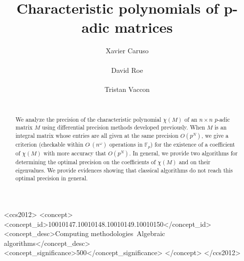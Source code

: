 \documentclass{sig-alternate-05-2015}
\newcommand{\Fp}{\mathbb{F}_p}
\newcommand{\softO}{O\tilde{~}}
\begin{document}
\newtheorem{theo}{Theorem}[section]
\newtheorem{lem}[theo]{Lemma}
\newtheorem{prop}[theo]{Proposition}
\newtheorem{cor}[theo]{Corollary}
\newtheorem{quest}[theo]{Question}
\newtheorem{conj}[theo]{Conjecture}
\theoremstyle{definition}
\newtheorem{rem}[theo]{Remark}
\newtheorem{ex}[theo]{Example}
\newtheorem{deftn}[theo]{Definition}

\title{Characteristic polynomials of p-adic matrices}

\author{
\alignauthor Xavier Caruso\\
  \\
\alignauthor David Roe\\
  \\
\alignauthor Tristan Vaccon\\
  \\
}

\maketitle

\begin{abstract}
We analyze the precision of the characteristic polynomial $\chi(M)$ of 
an $n \times n$ $p$-adic matrix $M$ using differential precision methods 
developed previously.  When $M$ is an integral matrix whose entries are 
all given at the same precision $O(p^N)$, we give a criterion (checkable 
within $\softO(n^\omega)$ operations in $\Fp$) for the existence of a
coefficient of $\chi(M)$ with more accuracy that $O(p^N)$.
In general, we provide two algorithms for determining the optimal 
precision on the coefficients of $\chi(M)$ and on their eigenvalues.
We provide evidences showing that classical algorithms do not reach
this optimal precision in general.
\end{abstract}

\begin{CCSXML}
<ccs2012>
<concept>
<concept_id>10010147.10010148.10010149.10010150</concept_id>
<concept_desc>Computing methodologies~Algebraic algorithms</concept_desc>
<concept_significance>500</concept_significance>
</concept>
</ccs2012>
\end{CCSXML}

\vspace{-1mm}
\printccsdesc
\end{document}
